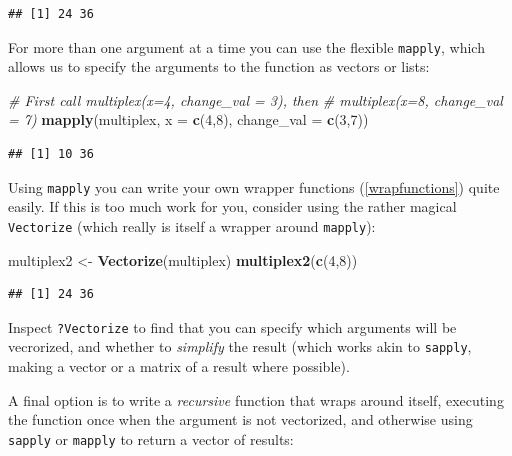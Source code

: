 \documentclass[]{book}
\newenvironment{Shaded}{\begin{snugshade}}{\end{snugshade}}
\newcommand{\CommentTok}[1]{\textcolor[rgb]{0.56,0.35,0.01}{\textit{#1}}}
\newcommand{\DataTypeTok}[1]{\textcolor[rgb]{0.13,0.29,0.53}{#1}}
\newcommand{\DecValTok}[1]{\textcolor[rgb]{0.00,0.00,0.81}{#1}}
\newcommand{\KeywordTok}[1]{\textcolor[rgb]{0.13,0.29,0.53}{\textbf{#1}}}
\newcommand{\NormalTok}[1]{#1}
\newcommand{\StringTok}[1]{\textcolor[rgb]{0.31,0.60,0.02}{#1}}
\begin{document}
\begin{verbatim}
## [1] 24 36
\end{verbatim}

For more than one argument at a time you can use the flexible \texttt{mapply}, which allows us to specify the arguments to the function as vectors or lists:

\begin{Shaded}
\begin{Highlighting}[]
\CommentTok{# First call multiplex(x=4, change_val = 3), then }
\CommentTok{# multiplex(x=8, change_val = 7)}
\KeywordTok{mapply}\NormalTok{(multiplex, }\DataTypeTok{x =} \KeywordTok{c}\NormalTok{(}\DecValTok{4}\NormalTok{,}\DecValTok{8}\NormalTok{), }\DataTypeTok{change_val =} \KeywordTok{c}\NormalTok{(}\DecValTok{3}\NormalTok{,}\DecValTok{7}\NormalTok{))}
\end{Highlighting}
\end{Shaded}

\begin{verbatim}
## [1] 10 36
\end{verbatim}

Using \texttt{mapply} you can write your own wrapper functions (\ref{wrapfunctions}) quite easily. If this is too much work for you, consider using the rather magical \texttt{Vectorize} (which really is itself a wrapper around \texttt{mapply}):

\begin{Shaded}
\begin{Highlighting}[]
\NormalTok{multiplex2 <-}\StringTok{ }\KeywordTok{Vectorize}\NormalTok{(multiplex)}
\KeywordTok{multiplex2}\NormalTok{(}\KeywordTok{c}\NormalTok{(}\DecValTok{4}\NormalTok{,}\DecValTok{8}\NormalTok{))}
\end{Highlighting}
\end{Shaded}

\begin{verbatim}
## [1] 24 36
\end{verbatim}

Inspect \texttt{?Vectorize} to find that you can specify which arguments will be vecrorized, and whether to \emph{simplify} the result (which works akin to \texttt{sapply}, making a vector or a matrix of a result where possible).

A final option is to write a \emph{recursive} function that wraps around itself, executing the function once when the argument is not vectorized, and otherwise using \texttt{sapply} or \texttt{mapply} to return a vector of results:
\end{document}
